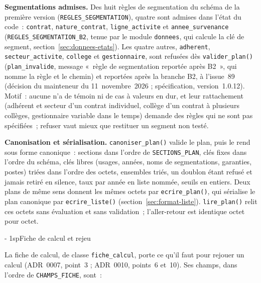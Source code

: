 \documentclass[a4paper,11pt]{article}
\makeatletter
\newcommand{\titrebandeau}[1]{%
  \noindent{\color{financeblue}\rule{\linewidth}{2.5pt}}
  \par\vspace{5mm}
  {\color{greenline}\raggedright\fontsize{19}{23}\bfseries\selectfont #1\par}
  \vspace{6mm}}
\newcommand{\charte@bandeau}[1]{%
  \parindent\z@ \everypar{\strut}%
  {\strut\par}\nobreak
  \titrebandeau{#1}\nobreak
  \kern\z@\nobreak\strut\par}
\newcommand{\charte@reserve}[1]{\par\ifinner\else\if@nobreak\else
  \penalty\z@ %
  \begingroup\setlength{\dimen@}{#1}%
  \dimen@ii\pagegoal \advance\dimen@ii-\pagetotal
  \ifdim\pagegoal=\maxdimen\else\ifdim\dimen@>\dimen@ii
    \vfil\penalty-\@M %
  \fi\fi\endgroup\fi\fi}
\renewcommand{\section}{\charte@reserve{12\baselineskip}%
  \@startsection{section}{1}{\z@}%
  {\z@}{1sp}{\normalfont\charte@bandeau}}
\newcommand{\code}[1]{\texttt{\small #1}}
\makeatother
\begin{document}
\textbf{Segmentations admises.} Des huit règles de segmentation du schéma
de la première version (\code{REGLES\_\allowbreak SEGMENTATION}), quatre sont admises
dans l'état du code~: \code{contrat}, \code{nature\_contrat},
\code{ligne\_activite} et \code{annee\_survenance}
(\code{REGLES\_SEGMENTATION\_B2}, tenue par le module \code{donnees}, qui
calcule la clé de segment, section~\ref{sec:donnees-etats}). Les quatre
autres, \code{adherent}, \code{secteur\_activite}, \code{college} et
\code{gestionnaire}, sont refusées dès \code{valider\_plan()}
(\code{plan\_invalide}, message «~règle de segmentation reportée après
B2~», qui nomme la règle et le chemin) et reportées après la branche B2,
à l'issue~89 (décision du mainteneur du 11~novembre~2026 ; spécification,
version~1.0.12).
Motif~: aucune n'a de témoin ni de cas à valeurs en dur, et leur
rattachement (adhérent et secteur d'un contrat individuel, collège d'un
contrat à plusieurs collèges, gestionnaire variable dans le temps) demande
des règles qui ne sont pas spécifiées~; refuser vaut mieux que restituer un
segment non testé.

\textbf{Canonisation et sérialisation.} \code{canoniser\_plan()} valide le
plan, puis le rend sous forme canonique~: sections dans l'ordre de
\code{SECTIONS\_PLAN}, clés fixes dans l'ordre du schéma, clés libres
(usages, années, noms de segmentations, garanties, postes) triées dans
l'ordre des octets, ensembles triés, un doublon étant refusé et jamais
retiré en silence, taux par année en liste nommée, seuils en entiers.
Deux plans de même sens donnent les mêmes octets par \code{ecrire\_plan()},
qui sérialise le plan canonique par \code{ecrire\_liste()}
(section~\ref{sec:format-liste}). \code{lire\_plan()} relit ces octets
sans évaluation et sans validation~; l'aller-retour est identique octet
pour octet.

\section{Fiche de calcul et rejeu}
\label{sec:plan-fiche}

La fiche de calcul, de classe \code{fiche\_calcul}, porte ce qu'il faut
pour rejouer un calcul (ADR~0007, point~3 ; ADR~0010, points~6 et~10). Ses
champs, dans l'ordre de \code{CHAMPS\_FICHE}, sont~:
\end{document}
